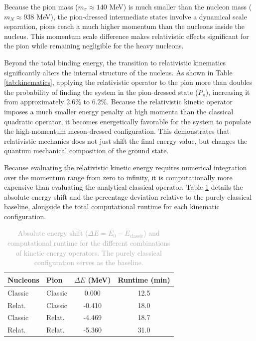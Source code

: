 \documentclass[a4paper,oneside,article,12pt]{memoir}
\begin{document}
Because the pion mass ($m_π \approx 140$ MeV) is much smaller than the nucleon mass ($m_N \approx 938$ MeV), the pion-dressed intermediate states involve a dynamical scale separation, pions reach a much higher momentum than the nucleons inside the nucleus. This momentum scale difference makes relativistic effects significant for the pion while remaining negligible for the heavy nucleons. 

Beyond the total binding energy, the transition to relativistic kinematics significantly alters the internal structure of the nucleus. As shown in Table \ref{tab:kinematics}, applying the relativistic operator to the pion more than doubles the probability of finding the system in the pion-dressed state ($P_\pi$), increasing it from approximately 2.6\% to 6.2\%. Because the relativistic kinetic operator imposes a much smaller energy penalty at high momenta than the classical quadratic operator, it becomes energetically favorable for the system to populate the high-momentum meson-dressed configuration. This demonstrates that relativistic mechanics does not just shift the final energy value, but changes the quantum mechanical composition of the ground state.

Because evaluating the relativistic kinetic energy requires numerical integration over the momentum range from zero to infinity, it is computationally more expensive than evaluating the analytical classical operator. Table \ref{tab:runtime_deviation} details the absolute energy shift and the percentage deviation relative to the purely classical baseline, alongside the total computational runtime for each kinematic configuration. 

\begin{table}[H]
    \centering
    \renewcommand{\arraystretch}{1.2}
    \begin{tabular}{ll cc}
        \hline
        \textbf{Nucleons} & \textbf{Pion} & \textbf{$\Delta E$ (MeV)} & \textbf{Runtime (min)} \\
        \hline
        Classic & Classic &    0.000 &   12.5 \\
        Relat.  & Classic &   -0.410 &   18.0 \\
        Classic & Relat.  &   -4.469 &   18.7 \\
        Relat.  & Relat.  &   -5.360 &   31.0 \\
        \hline
    \end{tabular}
    \caption{\textcolor{darkgray}{Absolute energy shift ($\Delta E = E_0 - E_{\text{classic}}$) and computational runtime for the different combinations of kinetic energy operators. The purely classical configuration serves as the baseline.}}
    \label{tab:runtime_deviation}
\end{table}
\end{document}
